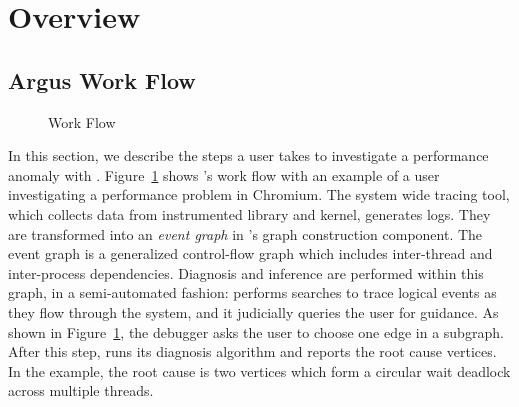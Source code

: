 \section{Overview}\label{sec:overview}

\subsection{Argus Work Flow}
\begin{figure}[tb]
    \centering
	
    \caption{\xxx Work Flow}
    \label{fig:argus-overview}
\end{figure}

In this section, we describe the steps a user takes to investigate a performance
anomaly with \xxx. Figure~\ref{fig:argus-overview} shows \xxx's work flow with
an example of a user investigating a performance problem in Chromium. The
system wide tracing tool, which collects data from \xxx instrumented library
and kernel, generates logs. They are transformed into an \emph{event graph} in \xxx's graph
construction component. The event graph is a
generalized control-flow graph which includes inter-thread and inter-process
dependencies. Diagnosis and inference are performed within this graph, in a
semi-automated fashion: \xxx performs searches to trace logical events as they
flow through the system, and it judicially queries the user for guidance.
As shown in Figure~\ref{fig:argus-overview}, the \xxx debugger asks the user to choose
one edge in a subgraph. After this step, \xxx runs its diagnosis algorithm and
reports the root cause vertices. In the example, the root cause is two vertices
which form a circular wait deadlock across multiple threads.
%
%

